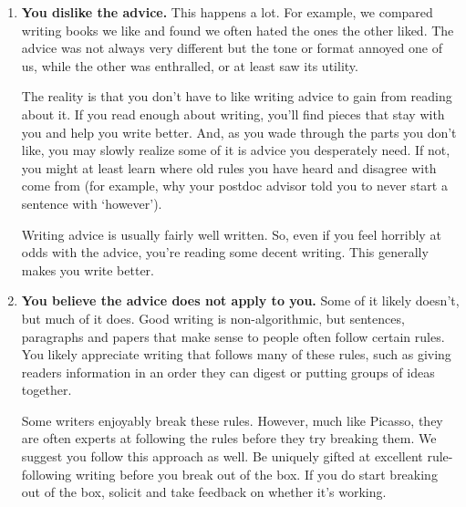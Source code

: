 \documentclass[11pt,letter]{article}
\begin{document}
\begin{enumerate}
\item {\bf You dislike the advice.} This happens a lot. For example, we compared writing books we like and found we often hated the ones the other liked. The advice was not always very different but the tone or format annoyed one of us, while the other was enthralled, or at least saw its utility. 

The reality is that you don't have to like writing advice to gain from reading about it. If you read enough about writing, you'll find pieces that stay with you and help you write better. And, as you wade through the parts you don't like, you may slowly realize some of it is advice you desperately need. If not, you might at least learn where old rules you have heard and disagree with come from (for example, why your postdoc advisor told you to never start a sentence with `however'). %

Writing advice is usually fairly well written. So, even if you feel horribly at odds with the advice, you're reading some decent writing. This generally makes you write better. 
\item {\bf You believe the advice does not apply to you.} Some of it likely doesn't, but much of it does. Good writing is non-algorithmic, but sentences, paragraphs and papers that make sense to people often follow certain rules. You likely appreciate writing that follows many of these rules, such as giving readers information in an order they can digest or putting groups of ideas together. 

Some writers enjoyably break these rules. However, much like Picasso, they are often experts at following the rules before they try breaking them. We suggest you follow this approach as well. Be uniquely gifted at excellent rule-following writing before you break out of the box. If you do start breaking out of the box, solicit and take feedback on whether it's working. 
\end{enumerate}
\end{document}
